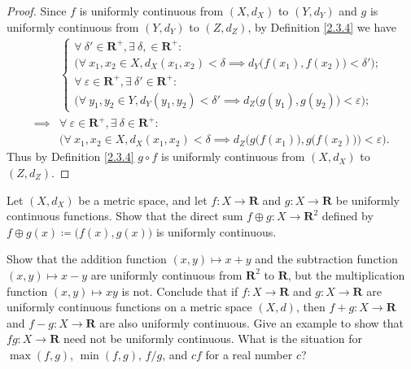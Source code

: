 \begin{proof}
    Since \(f\) is uniformly continuous from \((X, d_X)\) to \((Y, d_Y)\) and \(g\) is uniformly continuous from \((Y, d_Y)\) to \((Z, d_Z)\), by Definition \ref{2.3.4} we have
    \begin{align*}
                 & \begin{cases}
            \forall\ \delta' \in \mathbf{R}^+, \exists\ \delta, \in \mathbf{R}^+ :                                    \\
            \Big(\forall\ x_1, x_2 \in X, d_X(x_1, x_2) < \delta \implies d_Y\big(f(x_1), f(x_2)\big) < \delta'\Big); \\
            \forall\ \varepsilon \in \mathbf{R}^+, \exists\ \delta' \in \mathbf{R}^+ :                                \\
            \Big(\forall\ y_1, y_2 \in Y, d_Y(y_1, y_2) < \delta' \implies d_Z\big(g(y_1), g(y_2)\big) < \varepsilon\Big);
        \end{cases}                                                                                                            \\
        \implies & \forall\ \varepsilon \in \mathbf{R}^+, \exists\ \delta \in \mathbf{R}^+ :                                                             \\
                 & \bigg(\forall\ x_1, x_2 \in X, d_X(x_1, x_2) < \delta \implies d_Z\Big(g\big(f(x_1)\big), g\big(f(x_2)\big)\Big) < \varepsilon\bigg).
    \end{align*}
    Thus by Definition \ref{2.3.4} \(g \circ f\) is uniformly continuous from \((X, d_X)\) to \((Z, d_Z)\).
\end{proof}

\begin{exercise}\label{ex 2.3.5}
    Let \((X, d_X)\) be a metric space, and let \(f : X \to \mathbf{R}\) and \(g : X \to \mathbf{R}\) be uniformly continuous functions.
    Show that the direct sum \(f \oplus g : X \to \mathbf{R}^2\) defined by \(f \oplus g(x) \coloneqq \big(f(x), g(x)\big)\) is uniformly continuous.
\end{exercise}

\begin{exercise}\label{ex 2.3.6}
    Show that the addition function \((x, y) \mapsto x + y\) and the subtraction function \((x, y) \mapsto x - y\) are uniformly continuous from \(\mathbf{R}^2\) to \(\mathbf{R}\), but the multiplication function \((x, y) \mapsto xy\) is not.
    Conclude that if \(f : X \to \mathbf{R}\) and \(g : X \to \mathbf{R}\) are uniformly continuous functions on a metric space \((X, d)\), then \(f + g : X \to \mathbf{R}\) and \(f - g : X \to \mathbf{R}\) are also uniformly continuous.
    Give an example to show that \(fg : X \to \mathbf{R}\) need not be uniformly continuous.
    What is the situation for \(\max(f, g)\), \(\min(f, g)\), \(f / g\), and \(cf\) for a real number \(c\)?
\end{exercise}